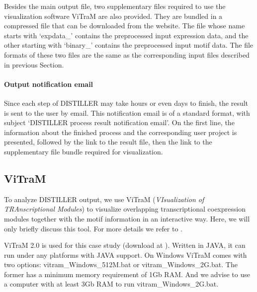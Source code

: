 Besides the main output file, two supplementary files required to use the visualization software ViTraM are also provided. They are bundled in a compressed file that can be downloaded from the website. The file whose name starts with `expdata\_' contains the preprocessed input expression data, and the other starting with `binary\_' contains the preprocessed input motif data. The file formats of these two files are the same as the corresponding input files described in previous Section. 

\paragraph{Output notification email}\label{sec:distiller-email}
Since each step of DISTILLER may take hours or even days to finish, the result is sent to the user by email. This notification email is of a standard format, with subject `DISTILLER process result notification email'. On the first line, the information about the finished process and the corresponding user project is presented, followed by the link to the result file, then the link to the supplementary file bundle required for visualization.




\subsection{ViTraM}\label{sec:dist-vitram}
To analyze DISTILLER output, we use ViTraM (\textit{VIsualization of TRAnscriptional Modules}) to visualize overlapping transcriptional coexpression modules together with the motif information in an interactive way. Here, we will only briefly discuss this tool. For more details we refer to \cite{Sun2009}.

ViTraM 2.0 is used for this case study (download at \cite{ViTraM}).  Written in JAVA, it can run under any platforms with JAVA support.  On Windows ViTraM comes with two options: vitram\_Windows\_512M.bat or vitram\_Windows\_2G.bat. The former has a minimum memory requirement of 1Gb RAM.  And we advise to use a computer with at least 3Gb RAM to run vitram\_Windows\_2G.bat. 



